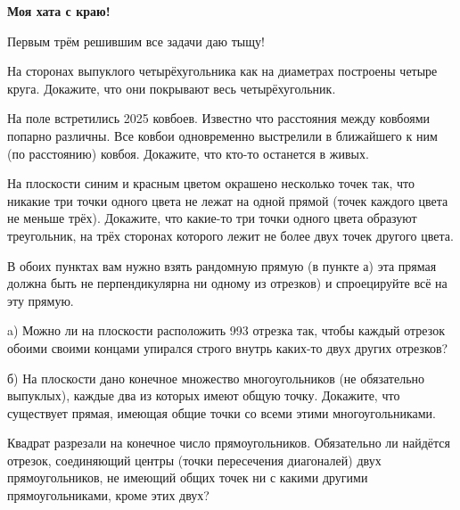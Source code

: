 \centerline{\bf \Huge Моя хата с краю!}

\begin{flushright}
        \scriptsize{Первым трём решившим все задачи даю тыщу!}
\end{flushright}

На сторонах выпуклого четырёхугольника как на диаметрах построены четыре круга. Докажите, что они покрывают весь четырёхугольник.

На поле встретились 2025 ковбоев. Известно что расстояния между ковбоями попарно различны. Все ковбои одновременно выстрелили в ближайшего к ним (по расстоянию) ковбоя. Докажите, что кто-то останется в живых.

На плоскости синим и красным цветом окрашено несколько точек так, что никакие три точки одного цвета не лежат на одной прямой (точек каждого цвета не меньше трёх). Докажите, что какие-то три точки одного цвета образуют треугольник, на трёх сторонах которого лежит не более двух точек другого цвета.


В обоих пунктах вам нужно взять рандомную прямую (в пункте а) эта прямая должна быть не перпендикулярна ни одному из отрезков) и спроецируйте всё на эту прямую.

a) Можно ли на плоскости расположить 993 отрезка так, чтобы каждый отрезок обоими своими концами упирался строго внутрь каких-то двух других отрезков?

б) На плоскости дано конечное множество многоугольников (не обязательно выпуклых), каждые два из которых имеют общую точку. Докажите, что существует прямая, имеющая общие точки со всеми этими многоугольниками. 

Квадрат разрезали на конечное число прямоугольников. Обязательно ли найдётся отрезок, соединяющий центры (точки пересечения диагоналей) двух прямоугольников, не имеющий общих точек ни с какими другими прямоугольниками, кроме этих двух?
